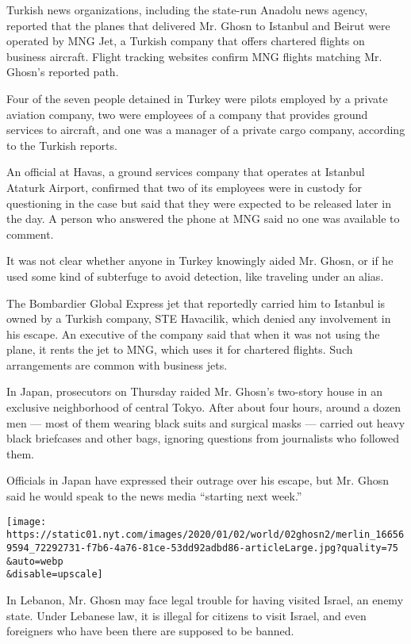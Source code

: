 Turkish news organizations, including the state-run Anadolu news agency,
reported that the planes that delivered Mr. Ghosn to Istanbul and Beirut
were operated by MNG Jet, a Turkish company that offers chartered
flights on business aircraft. Flight tracking websites confirm MNG
flights matching Mr. Ghosn's reported path.

Four of the seven people detained in Turkey were pilots employed by a
private aviation company, two were employees of a company that provides
ground services to aircraft, and one was a manager of a private cargo
company, according to the Turkish reports.

An official at Havas, a ground services company that operates at
Istanbul Ataturk Airport, confirmed that two of its employees were in
custody for questioning in the case but said that they were expected to
be released later in the day. A person who answered the phone at MNG
said no one was available to comment.

It was not clear whether anyone in Turkey knowingly aided Mr. Ghosn, or
if he used some kind of subterfuge to avoid detection, like traveling
under an alias.

The Bombardier Global Express jet that reportedly carried him to
Istanbul is owned by a Turkish company, STE Havacilik, which denied any
involvement in his escape. An executive of the company said that when it
was not using the plane, it rents the jet to MNG, which uses it for
chartered flights. Such arrangements are common with business jets.

In Japan, prosecutors on Thursday raided Mr. Ghosn's two-story house in
an exclusive neighborhood of central Tokyo. After about four hours,
around a dozen men --- most of them wearing black suits and surgical
masks --- carried out heavy black briefcases and other bags, ignoring
questions from journalists who followed them.

Officials in Japan have expressed their outrage over his escape, but Mr.
Ghosn said he would speak to the news media ``starting next week.''

\texttt{[image: https://static01.nyt.com/images/2020/01/02/world/02ghosn2/merlin\_166569594\_72292731-f7b6-4a76-81ce-53dd92adbd86-articleLarge.jpg?quality=75\\\&auto=webp\\\&disable=upscale]}

In Lebanon, Mr. Ghosn may face legal trouble for having visited Israel,
an enemy state. Under Lebanese law, it is illegal for citizens to visit
Israel, and even foreigners who have been there are supposed to be
banned.

